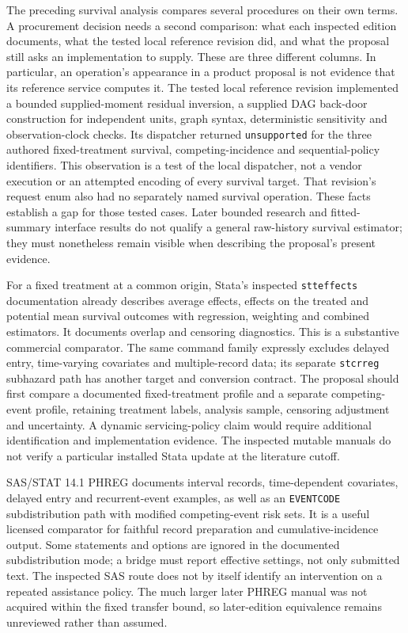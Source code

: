The preceding survival analysis compares several procedures on their own
terms. A procurement decision needs a second comparison: what each inspected
edition documents, what the tested local reference revision did, and what
the proposal still asks an implementation to supply. These are three different
columns. In particular, an operation's appearance in a product proposal is
not evidence that its reference service computes it. The tested local
reference revision implemented a bounded supplied-moment residual inversion,
a supplied DAG back-door construction for independent units, graph syntax,
deterministic sensitivity and observation-clock checks. Its dispatcher returned
\texttt{unsupported} for the three authored fixed-treatment survival,
competing-incidence and sequential-policy identifiers. This observation is a
test of the local dispatcher, not a vendor execution or an attempted encoding
of every survival target. That revision's request enum also had no separately
named survival operation. These facts establish a gap for those tested cases.
Later bounded research and fitted-summary interface results do not qualify a
general raw-history survival estimator; they must nonetheless remain visible
when describing the proposal's present evidence.
\citep{exec16_commercial_runtime}

For a fixed treatment at a common origin, Stata's inspected
\texttt{stteffects} documentation already describes average effects, effects
on the treated and potential mean survival outcomes with regression,
weighting and combined estimators. It documents overlap and censoring
diagnostics. This is a substantive commercial comparator. The same command
family expressly excludes delayed entry, time-varying covariates and
multiple-record data; its separate \texttt{stcrreg} subhazard path has another
target and conversion contract. The proposal should first compare a
documented fixed-treatment profile and a separate competing-event profile,
retaining treatment labels, analysis sample, censoring adjustment and
uncertainty. A dynamic servicing-policy claim would require additional
identification and implementation evidence. The inspected mutable manuals
do not verify a particular installed Stata update at the literature cutoff.
\citep{exec14_survival_stata,exec14_survival_stata_competing}

SAS/STAT 14.1 PHREG documents interval records, time-dependent covariates,
delayed entry and recurrent-event examples, as well as an
\texttt{EVENTCODE} subdistribution path with modified competing-event risk
sets. It is a useful licensed comparator for faithful record preparation and
cumulative-incidence output. Some statements and options are ignored in the
documented subdistribution mode; a bridge must report effective settings,
not only submitted text. The inspected SAS route does not by itself identify
an intervention on a repeated assistance policy. The much larger later PHREG
manual was not acquired within the fixed transfer bound, so later-edition
equivalence remains unreviewed rather than assumed.
\citep{exec14_survival_sas}

